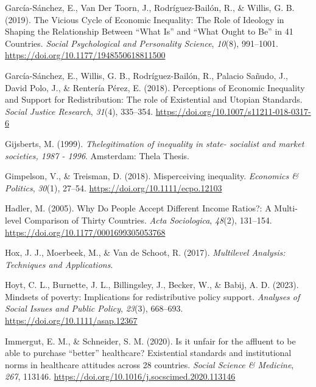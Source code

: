 \documentclass[
  12pt,
]{article}
\newlength{\cslhangindent}
\newlength{\cslentryspacingunit} %
\newenvironment{CSLReferences}[2] %
 {%
  \setlength{\parindent}{0pt}
  \ifodd #1
  \let\oldpar\par
  \def\par{\hangindent=\cslhangindent\oldpar}
  \fi
  \setlength{\parskip}{#2\cslentryspacingunit}
 }%
 {}
\begin{document}
\begin{CSLReferences}{1}{0}
\leavevmode{}%
García-Sánchez, E., Van Der Toorn, J., Rodríguez-Bailón, R., \& Willis,
G. B. (2019). The {Vicious Cycle} of {Economic Inequality}: {The Role}
of {Ideology} in {Shaping} the {Relationship Between} {``{What Is}''}
and {``{What Ought} to {Be}''} in 41 {Countries}. \emph{Social
Psychological and Personality Science}, \emph{10}(8), 991--1001.
\url{https://doi.org/10.1177/1948550618811500}

\leavevmode{}%
García-Sánchez, E., Willis, G. B., Rodríguez-Bailón, R., Palacio Sañudo,
J., David Polo, J., \& Rentería Pérez, E. (2018). Perceptions of
{Economic Inequality} and {Support} for {Redistribution}: {The} role of
{Existential} and {Utopian Standards}. \emph{Social Justice Research},
\emph{31}(4), 335--354. \url{https://doi.org/10.1007/s11211-018-0317-6}

\leavevmode{}%
Gijsberts, M. (1999). \emph{{Thelegitimation of inequality in state-
socialist and market societies, 1987 - 1996}}. Amsterdam: Thela Thesis.

\leavevmode{}%
Gimpelson, V., \& Treisman, D. (2018). Misperceiving inequality.
\emph{Economics \& Politics}, \emph{30}(1), 27--54.
\url{https://doi.org/10.1111/ecpo.12103}

\leavevmode{}%
Hadler, M. (2005). Why {Do People Accept Different Income Ratios}?: {A
Multi-level Comparison} of {Thirty Countries}. \emph{Acta Sociologica},
\emph{48}(2), 131--154. \url{https://doi.org/10.1177/0001699305053768}

\leavevmode{}%
Hox, J. J., Moerbeek, M., \& Van de Schoot, R. (2017). \emph{Multilevel
{Analysis}: {Techniques} and {Applications}}.

\leavevmode{}%
Hoyt, C. L., Burnette, J. L., Billingsley, J., Becker, W., \& Babij, A.
D. (2023). Mindsets of poverty: {Implications} for redistributive policy
support. \emph{Analyses of Social Issues and Public Policy},
\emph{23}(3), 668--693. \url{https://doi.org/10.1111/asap.12367}

\leavevmode{}%
Immergut, E. M., \& Schneider, S. M. (2020). Is it unfair for the
affluent to be able to purchase {``better''} healthcare? {Existential}
standards and institutional norms in healthcare attitudes across 28
countries. \emph{Social Science \& Medicine}, \emph{267}, 113146.
\url{https://doi.org/10.1016/j.socscimed.2020.113146}


\end{CSLReferences}
\end{document}
